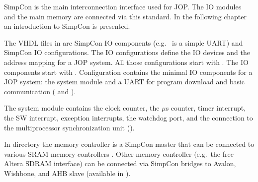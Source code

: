 SimpCon \cite{simpcon} is the main interconnection interface used
for JOP. The IO modules and the main memory are connected via this
standard. In the following chapter an introduction to SimpCon is
presented.

The VHDL files in  are SimpCon IO components
(e.g.\  is a simple UART) and SimpCon IO
configurations. The IO configurations define the IO devices and the
address mapping for a JOP system. All those configurations start
with . The IO components start with .
Configuration  contains the minimal IO components
for a JOP system: the system module  and a UART
 for program download and basic communication
( and ).

The system module  contains the clock counter, the
$\mu$s counter, timer interrupt, the SW interrupt, exception
interrupts, the watchdog port, and the connection to the
multiprocessor synchronization unit ().

In directory  the memory controller
 is a SimpCon master that can be connected to
various SRAM memory controllers . Other memory
controller (e.g.\ the free Altera SDRAM interface) can be connected
via SimpCon bridges to Avalon, Wishbone, and AHB slave (available in
).
